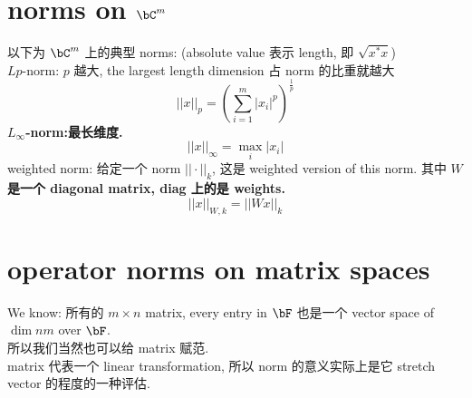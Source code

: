 \documentclass[lang=cn,11pt]{elegantbook}
\begin{document}
\section{norms on $\bC^m$}
\begin{example}
以下为 $\bC^m$ 上的典型 norms: (absolute value 表示 length, 即 $\sqrt{x^*x}$) \\
$Lp$-norm: $p$ 越大, the largest length dimension 占 norm 的比重就越大
$$
    ||x||_p = (\sum_{i=1}^m |x_i|^p)^{\frac{1}{p}}
$$
\textbf{$L_\infty$-norm:最长维度.}$$
    ||x||_\infty = \max_i |x_i|
    $$
weighted norm: 给定一个 norm $||\cdot||_k$, 这是 weighted version of this norm. 其中 \textbf{$W$ 是一个 diagonal matrix, diag 上的是 weights.}
$$
||x||_{W,k}= ||Wx||_{k}
$$
\end{example}





\section{operator norms on matrix spaces}

We know: 所有的 $m \times n$ matrix, every entry in $\bF$ 也是一个 vector space of $\dim nm$ over $\bF$.\\
所以我们当然也可以给 matrix 赋范.\\
matrix 代表一个 linear transformation, 所以 norm 的意义实际上是它 stretch vector 的程度的一种评估.
\end{document}
